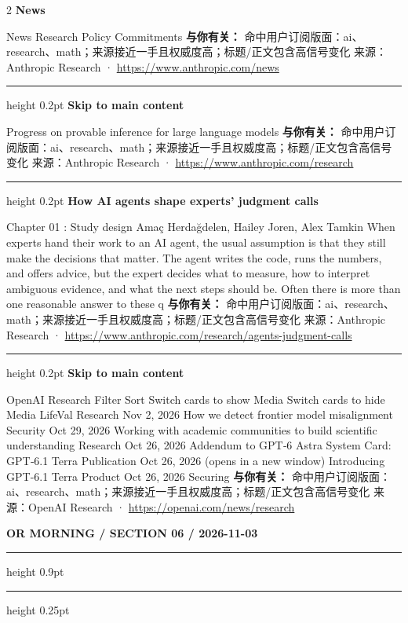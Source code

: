 \documentclass[10.5pt]{ctexart}
\begin{document}
\begin{multicols}{2}
{\large\bfseries News}\par
News Research Policy Commitments
\textbf{与你有关：} 命中用户订阅版面：ai、research、math；来源接近一手且权威度高；标题/正文包含高信号变化
{\footnotesize\color{ormuted} 来源：Anthropic Research · \url{https://www.anthropic.com/news}}
\vspace{2mm}
\hrule height 0.2pt
\vspace{2mm}
{\large\bfseries Skip to main content}\par
Progress on provable inference for large language models
\textbf{与你有关：} 命中用户订阅版面：ai、research、math；来源接近一手且权威度高；标题/正文包含高信号变化
{\footnotesize\color{ormuted} 来源：Anthropic Research · \url{https://www.anthropic.com/research}}
\vspace{2mm}
\hrule height 0.2pt
\vspace{2mm}
{\large\bfseries How AI agents shape experts’ judgment calls}\par
Chapter 01 : Study design Amaç Herdağdelen, Hailey Joren, Alex Tamkin When experts hand their work to an AI agent, the usual assumption is that they still make the decisions that matter. The agent writes the code, runs the numbers, and offers advice, but the expert decides what to measure, how to interpret ambiguous evidence, and what the next steps should be. Often there is more than one reasonable answer to these q
\textbf{与你有关：} 命中用户订阅版面：ai、research、math；来源接近一手且权威度高；标题/正文包含高信号变化
{\footnotesize\color{ormuted} 来源：Anthropic Research · \url{https://www.anthropic.com/research/agents-judgment-calls}}
\vspace{2mm}
\hrule height 0.2pt
\vspace{2mm}
{\large\bfseries Skip to main content}\par
OpenAI Research Filter Sort Switch cards to show Media Switch cards to hide Media LifeVal Research Nov 2, 2026 How we detect frontier model misalignment Security Oct 29, 2026 Working with academic communities to build scientific understanding Research Oct 26, 2026 Addendum to GPT‑6 Astra System Card: GPT‑6.1 Terra Publication Oct 26, 2026 (opens in a new window) Introducing GPT-6.1 Terra Product Oct 26, 2026 Securing
\textbf{与你有关：} 命中用户订阅版面：ai、research、math；来源接近一手且权威度高；标题/正文包含高信号变化
{\footnotesize\color{ormuted} 来源：OpenAI Research · \url{https://openai.com/news/research}}
\end{multicols}
\newpage
{\small\bfseries OR MORNING / SECTION 06 / 2026-11-03}
\vspace{2mm}
\hrule height 0.9pt
\vspace{1.5mm}
\hrule height 0.25pt
\vspace{4mm}
\end{document}
